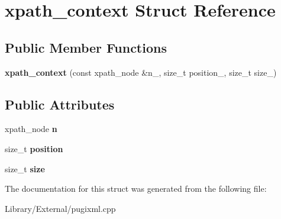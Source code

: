 \hypertarget{structxpath__context}{}\section{xpath\+\_\+context Struct Reference}
\label{structxpath__context}
\subsection*{Public Member Functions}
\begin{DoxyCompactItemize}
\item 
\hypertarget{structxpath__context_ab5d7a8d5a14ef695b93e15cfb0e20386}{}{\bfseries xpath\+\_\+context} (const xpath\+\_\+node \&n\+\_\+, size\+\_\+t position\+\_\+, size\+\_\+t size\+\_\+)\label{structxpath__context_ab5d7a8d5a14ef695b93e15cfb0e20386}

\end{DoxyCompactItemize}
\subsection*{Public Attributes}
\begin{DoxyCompactItemize}
\item 
\hypertarget{structxpath__context_ace8fbb8121820bc5054605c166101273}{}xpath\+\_\+node {\bfseries n}\label{structxpath__context_ace8fbb8121820bc5054605c166101273}

\item 
\hypertarget{structxpath__context_add1fc9bd16b21d3a8d7a4bd63c60af07}{}size\+\_\+t {\bfseries position}\label{structxpath__context_add1fc9bd16b21d3a8d7a4bd63c60af07}

\item 
\hypertarget{structxpath__context_a976ffb0eff84a7779c97e589c1785d1c}{}size\+\_\+t {\bfseries size}\label{structxpath__context_a976ffb0eff84a7779c97e589c1785d1c}

\end{DoxyCompactItemize}


The documentation for this struct was generated from the following file\+:\begin{DoxyCompactItemize}
\item 
Library/\+External/pugixml.\+cpp\end{DoxyCompactItemize}
